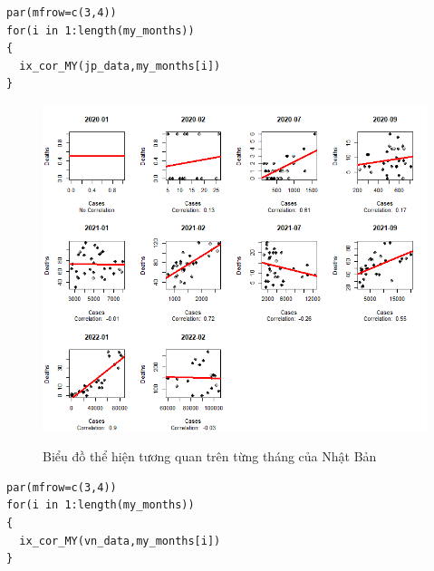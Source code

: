 \documentclass[a4paper]{article}
\theoremstyle{definition}
\begin{document}
\begin{enumerate}[i)]
\begin{enumerate}[1)]
\newpage
\lstset{
    title=Source code for Japan}
\begin{lstlisting}[frame=single]  
par(mfrow=c(3,4))
for(i in 1:length(my_months))
{
  ix_cor_MY(jp_data,my_months[i])
}
\end{lstlisting}
\begin{figure}[h!]
	\begin{center}
	    \includegraphics[scale=0.8]{Images/IV/Japan.png}
        \label{fig:my_label}
	\end{center}
\end{figure}
\begin{figure}[h!]
    \begin{center}
	    \caption{Biểu đồ thể hiện tương quan trên từng tháng của Nhật Bản}
	\end{center}
\end{figure}
\newpage
\lstset{
    title=Source code for Vietnam}
\begin{lstlisting}[frame=single]  
par(mfrow=c(3,4))
for(i in 1:length(my_months))
{
  ix_cor_MY(vn_data,my_months[i])
}
\end{lstlisting}
\begin{figure}[h!]
	\begin{center}

\end{center}
\end{figure}
\end{enumerate}
\end{enumerate}
\end{document}
